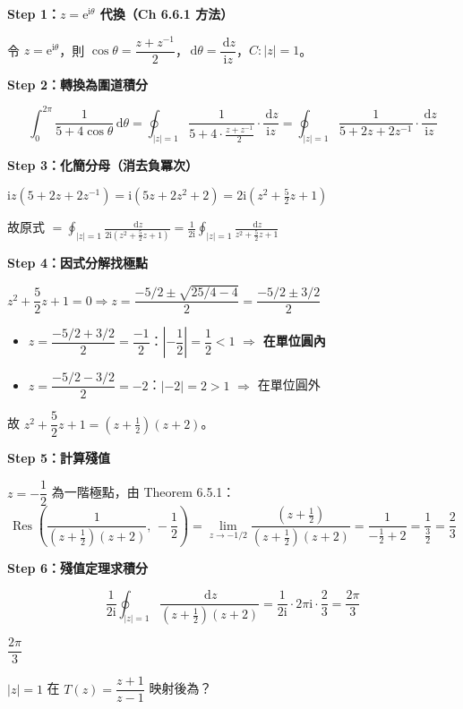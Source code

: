 \documentclass[12pt,a4paper]{article}
\newcommand{\dd}{\,\mathrm{d}}
\newcommand{\ii}{\mathrm{i}}
\newcommand{\ee}{\mathrm{e}}
\newcommand{\Res}{\operatorname{Res}}
\begin{document}
\begin{solbox}[解]
\textbf{Step 1：$z=\ee^{\ii\theta}$ 代換（Ch 6.6.1 方法）}

令 $z=\ee^{\ii\theta}$，則 $\cos\theta=\dfrac{z+z^{-1}}{2}$，$\dd{\theta}=\dfrac{\dd{z}}{\ii z}$，$C:|z|=1$。

\textbf{Step 2：轉換為圍道積分}

$$\int_0^{2\pi}\frac{1}{5+4\cos\theta}\dd{\theta}=\oint_{|z|=1}\frac{1}{5+4\cdot\frac{z+z^{-1}}{2}}\cdot\frac{\dd{z}}{\ii z}=\oint_{|z|=1}\frac{1}{5+2z+2z^{-1}}\cdot\frac{\dd{z}}{\ii z}$$

\textbf{Step 3：化簡分母（消去負冪次）}

$\ii z(5+2z+2z^{-1})=\ii(5z+2z^2+2)=2\ii(z^2+\tfrac{5}{2}z+1)$

故原式 $=\displaystyle\oint_{|z|=1}\frac{\dd{z}}{2\ii(z^2+\frac{5}{2}z+1)}=\frac{1}{2\ii}\oint_{|z|=1}\frac{\dd{z}}{z^2+\frac{5}{2}z+1}$

\textbf{Step 4：因式分解找極點}

$z^2+\dfrac{5}{2}z+1=0 \Rightarrow z=\dfrac{-5/2\pm\sqrt{25/4-4}}{2}=\dfrac{-5/2\pm 3/2}{2}$

\begin{itemize}
\item $z=\dfrac{-5/2+3/2}{2}=\dfrac{-1}{2}$：$\left|-\dfrac{1}{2}\right|=\dfrac{1}{2}<1$ $\Rightarrow$ \textbf{在單位圓內}
\item $z=\dfrac{-5/2-3/2}{2}=-2$：$|-2|=2>1$ $\Rightarrow$ 在單位圓外
\end{itemize}

故 $z^2+\dfrac{5}{2}z+1=(z+\tfrac{1}{2})(z+2)$。

\textbf{Step 5：計算殘值}

$z=-\dfrac{1}{2}$ 為一階極點，由 Theorem 6.5.1：
$$\Res\!\left(\frac{1}{(z+\frac{1}{2})(z+2)},\,-\frac{1}{2}\right)=\lim_{z\to -1/2}\frac{(z+\frac{1}{2})}{(z+\frac{1}{2})(z+2)}=\frac{1}{-\frac{1}{2}+2}=\frac{1}{\frac{3}{2}}=\frac{2}{3}$$

\textbf{Step 6：殘值定理求積分}

$$\frac{1}{2\ii}\oint_{|z|=1}\frac{\dd{z}}{(z+\frac{1}{2})(z+2)}=\frac{1}{2\ii}\cdot 2\pi\ii\cdot\frac{2}{3}=\frac{2\pi}{3}$$
\end{solbox}

\begin{ansbox}
$\boxed{\dfrac{2\pi}{3}}$
\end{ansbox}

\begin{qbox}[第 11 題\,---\,線性分式變換]
$|z|=1$ 在 $T(z)=\dfrac{z+1}{z-1}$ 映射後為？
\end{qbox}
\end{document}

